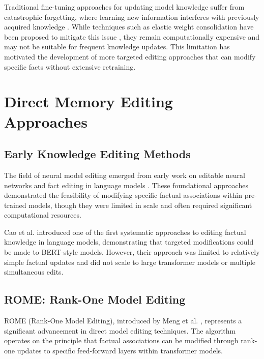 Traditional fine-tuning approaches for updating model knowledge suffer from catastrophic forgetting, where learning new information interferes with previously acquired knowledge \cite{mccloskey_1989_catastrophic}. While techniques such as elastic weight consolidation have been proposed to mitigate this issue \cite{kirkpatrick_2017_overcoming}, they remain computationally expensive and may not be suitable for frequent knowledge updates. This limitation has motivated the development of more targeted editing approaches that can modify specific facts without extensive retraining.


\section{Direct Memory Editing Approaches}

\subsection{Early Knowledge Editing Methods}

The field of neural model editing emerged from early work on editable neural networks \cite{sinitsin_2020_editable_neural} and fact editing in language models \cite{cao_2021_editing_factual_knowledge}. These foundational approaches demonstrated the feasibility of modifying specific factual associations within pre-trained models, though they were limited in scale and often required significant computational resources.

Cao et al. \cite{cao_2021_editing_factual_knowledge} introduced one of the first systematic approaches to editing factual knowledge in language models, demonstrating that targeted modifications could be made to BERT-style models. However, their approach was limited to relatively simple factual updates and did not scale to large transformer models or multiple simultaneous edits.

\subsection{ROME: Rank-One Model Editing}

ROME (Rank-One Model Editing), introduced by Meng et al. \cite{meng_2022_locating}, represents a significant advancement in direct model editing techniques. The algorithm operates on the principle that factual associations can be modified through rank-one updates to specific feed-forward layers within transformer models.

